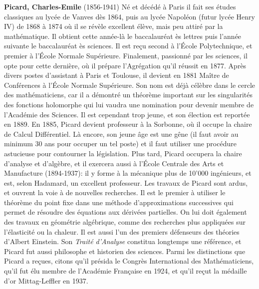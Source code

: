 \textbf{Picard, Charles-Emile} (1856-1941) Né et décédé à Paris il fait ses études classiques au lycée de Vanves dès 1864, puis au lycée Napoléon (futur lycée Henry IV) de 1868 à 1874 où il se révèle excellent élève, mais peu attiré par la mathématique. Il obtient cette année-là le baccalauréat ès lettres puis l'année suivante le baccalauréat ès sciences. Il est reçu second à l'École Polytechnique, et premier à l'École Normale Supérieure. Finalement, passionné par les sciences, il opte pour cette dernière, où il prépare l'Agrégation qu'il réussit en 1877. Après divers postes d'assistant à Paris et Toulouse, il devient en 1881 Maître de Conférences à l'École Normale Supérieure. Son nom est déjà célèbre dans le cercle des mathématiciens, car il a démontré un théorème important sur les singularités des fonctions holomorphe qui lui vaudra une nomination pour devenir membre de l'Académie des Sciences. Il est cependant trop jeune, et son élection est reportée en 1889. En 1885, Picard devient professeur à la Sorbonne, où il occupe la chaire de Calcul Différentiel. Là encore, son jeune âge est une gêne (il faut avoir au minimum 30 ans pour occuper un tel poste) et il faut utiliser une procédure astucieuse pour contourner la législation. Plus tard, Picard occupera la chaire d'analyse et d'algèbre, et il exercera aussi à l'École Centrale des Arts et Manufacture (1894-1937): il y forme à la mécanique plus de 10'000 ingénieurs, et est, selon Hadamard, un excellent professeur. Les travaux de Picard sont ardus, et ouvrent la voie à de nouvelles recherches. Il est le premier à utiliser le théorème du point fixe dans une méthode d'approximations successives qui permet de résoudre des équations aux dérivées partielles. On lui doit également des travaux en géométrie algébrique, comme des recherches plus appliquées sur l'élasticité ou la chaleur. Il est aussi l'un des premiers défenseurs des théories d'Albert Einstein. Son \textit{Traité d'Analyse} constitua longtemps une référence, et Picard fut aussi philosophe et historien des sciences. Parmi les distinctions que Picard a reçues, citons qu'il présida le Congrès International des Mathématiciens, qu'il fut élu membre de l'Académie Française en 1924, et qu'il reçut la médaille d'or Mittag-Leffler en 1937.

